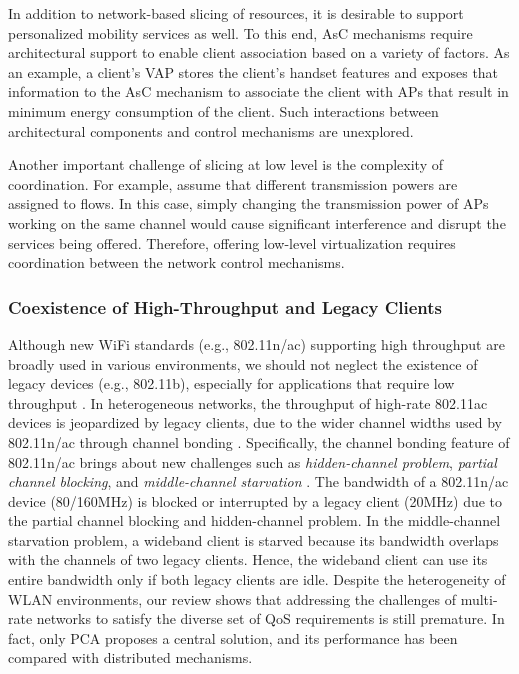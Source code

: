 In addition to network-based slicing of resources, it is desirable to support personalized mobility services as well.
To this end, AsC mechanisms require architectural support to enable client association based on a variety of factors.
As an example, a client's VAP stores the client's handset features and exposes that information to the AsC mechanism to associate the client with APs that result in minimum energy consumption of the client.
Such interactions between architectural components and control mechanisms are unexplored.

Another important challenge of slicing at low level is the complexity of coordination.
For example, assume that different transmission powers are assigned to flows. 
In this case, simply changing the transmission power of APs working on the same channel would cause significant interference and disrupt the services being offered.
Therefore, offering low-level virtualization requires coordination between the network control mechanisms.



\subsubsection{\textbf{Coexistence of High-Throughput and Legacy Clients}}
Although new WiFi standards (e.g., 802.11n/ac) supporting high throughput are broadly used in various environments, we should not neglect the existence of legacy devices (e.g., 802.11b), especially for applications that require low throughput \cite{Tozlu2012,CYW43907,BCM4343}.
In heterogeneous networks, the throughput of high-rate 802.11ac devices is jeopardized by legacy clients, due to the wider channel widths used by 802.11n/ac through channel bonding \cite{Zeng2014,han_fair_2016}. 
Specifically, the channel bonding feature of 802.11n/ac brings about new challenges such as \textit{hidden-channel problem}, \textit{partial channel blocking}, and \textit{middle-channel starvation} \cite{802.11ac-PCA,han_fair_2016,zhang2011adaptive}. 
The bandwidth of a 802.11n/ac device (80/160MHz) is blocked or interrupted by a legacy client (20MHz) due to the partial channel blocking and hidden-channel problem.
In the middle-channel starvation problem, a wideband client is starved because its bandwidth overlaps with the channels of two legacy clients.
Hence, the wideband client can use its entire bandwidth only if both legacy clients are idle. 
Despite the heterogeneity of WLAN environments, our review shows that addressing the challenges of multi-rate networks to satisfy the diverse set of QoS requirements is still premature. 
In fact, only PCA \cite{802.11ac-PCA} proposes a central solution, and its performance has been compared with distributed mechanisms.

